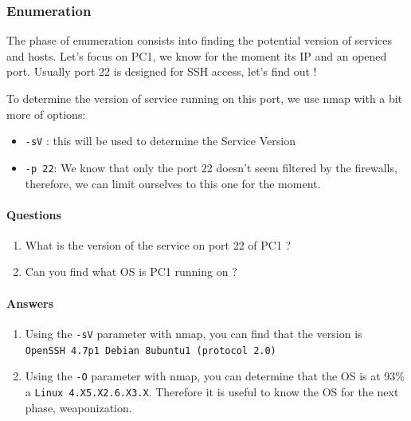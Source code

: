 \documentclass[a4paper,11pt,singlespacing]{article}
\providecommand{\tightlist}{%
  \setlength{\itemsep}{0pt}\setlength{\parskip}{0pt}}
\begin{document}
\subsubsection{Enumeration}\label{enumeration}

The phase of enumeration consists into finding the potential version of
services and hosts. Let's focus on PC1, we know for the moment its IP
and an opened port. Usually port 22 is designed for SSH access, let's
find out !

To determine the version of service running on this port, we use nmap
with a bit more of options:

\begin{itemize}
\tightlist
\item
  \texttt{-sV} : this will be used to determine the Service Version
\item
  \texttt{-p\ 22}: We know that only the port 22 doesn't seem filtered
  by the firewalls, therefore, we can limit ourselves to this one for
  the moment.
\end{itemize}

\paragraph{Questions}\label{questions-1}

\begin{enumerate}
\def\labelenumi{\arabic{enumi}.}
\tightlist
\item
  What is the version of the service on port 22 of PC1 ?
\item
  Can you find what OS is PC1 running on ?
\end{enumerate}

\pagebreak

\paragraph{Answers}\label{answers-1}

\begin{enumerate}
\def\labelenumi{\arabic{enumi}.}
\tightlist
\item
  Using the \texttt{-sV} parameter with nmap, you can find that the
  version is \texttt{OpenSSH\ 4.7p1\ Debian\ 8ubuntu1\ (protocol\ 2.0)}
\item
  Using the \texttt{-O} parameter with nmap, you can determine that the
  OS is at 93\% a
  \texttt{Linux\ 4.X\textbar{}5.X\textbar{}2.6.X\textbar{}3.X}.
  Therefore it is useful to know the OS for the next phase,
  weaponization.
\end{enumerate}
\end{document}
